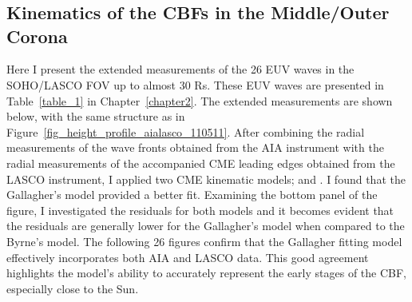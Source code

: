 \chapter{}
\label{appendix}

\section{Kinematics of the CBFs in the Middle/Outer Corona}
\label{ch2_append}
Here I present the extended measurements of the 26 EUV waves in the SOHO/LASCO FOV up to almost 30 Rs. These EUV waves are presented in Table~\ref{table_1} in Chapter~\ref{chapter2}. The extended measurements are shown below, with the same structure as in Figure~\ref{fig_height_profile_aialasco_110511}.
After combining the radial measurements of the wave fronts obtained from the AIA instrument with the radial measurements of the accompanied CME leading edges obtained from the LASCO instrument, I applied two CME kinematic models; \citet{gallagher_2003} and \citet{byrne_2013}. I found that the Gallagher's model provided a better fit. Examining the bottom panel of the figure, I investigated the residuals for both models and it becomes evident that the residuals are generally lower for the Gallagher's model when compared to the Byrne's model.
The following 26 figures confirm that the Gallagher fitting model effectively incorporates both AIA and LASCO data. This good agreement highlights the model's ability to accurately represent the early stages of the CBF, especially close to the Sun.

